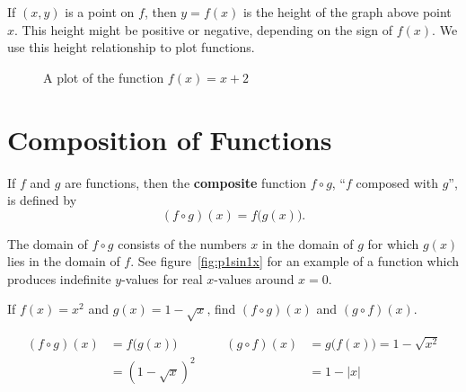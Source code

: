 If $ (x,y) $ is a point on $f$, then $y=f(x)$ is the height of the graph above point $x$.
This height might be positive or negative, depending on the sign of $f(x)$.
We use this height relationship to plot functions.
\begin{figure}[H]
    \begin{center}
      \caption{A plot of the function $f(x)=x+2$}
    \end{center}
  \end{figure}

\section{Composition of Functions}
\label{sec:compositefunctions}
\begin{defn}
  If $f$ and $g$ are functions, then the \textbf{composite} function $f \circ g$, ``$f$ composed with $g$'', is defined by
  \[ (f \circ g)(x)=f\bigl(g(x)\bigr) \text{.} \]
  \begin{remark}
    The domain of $ f \circ g $ consists of the numbers $x$ in the domain of $g$ for which $g(x)$ lies in the domain of $f$.
    See figure~\ref{fig:p1sin1x} for an example of a function which produces indefinite $y$-values for real $x$-values around $x=0$.
  \end{remark}
\end{defn}
\begin{ex}
  If
  $f(x)=x^2$
  and
  $g(x)=1-\sqrt{x}\text{,}$
  find $ (f \circ g)(x) $ and $ (g \circ f)(x)$.
  \begin{sol}
    \begin{align*}
      (f \circ g)(x)
      &=f\big(g(x)\big)
      &&&
      (g \circ f)(x)
      &=g\big(f(x)\big)=1-\sqrt{x^2}
      \\
      &=(1-\sqrt{x})^2
      &&&
      &= 1-|x|
    \end{align*}
  \end{sol}
\end{ex}

